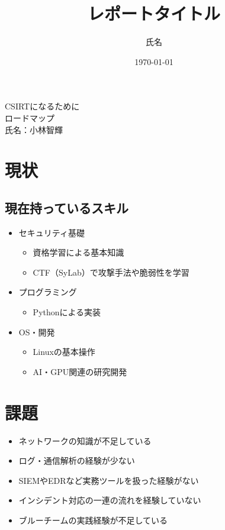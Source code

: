 \documentclass[a4paper,11pt,lualatex,ja=standard]{bxjsarticle}
\newcommand{\cover}[3]{
  \thispagestyle{empty}
  \vspace*{4cm}
  \begin{center}
    {\LARGE #1}\\[2cm]
    {\Large #2}\\[3cm]
    {\large 氏名：#3}\\[1cm]
  \end{center}
  \newpage
}
\begin{document}
\cover{CSIRTになるために}{ロードマップ}{小林智輝}

\title{レポートタイトル}
\author{氏名}
\date{\today}

\section{現状}

\subsection*{現在持っているスキル}

\begin{itemize}
    \item セキュリティ基礎
    \begin{itemize}
        \item 資格学習による基本知識
        \item CTF（SyLab）で攻撃手法や脆弱性を学習
    \end{itemize}

    \item プログラミング
    \begin{itemize}
        \item Pythonによる実装
    \end{itemize}

    \item OS・開発
    \begin{itemize}
        \item Linuxの基本操作
        \item AI・GPU関連の研究開発
    \end{itemize}
\end{itemize}

\section{課題}

\begin{itemize}
    \item ネットワークの知識が不足している
    \item ログ・通信解析の経験が少ない
    \item SIEMやEDRなど実務ツールを扱った経験がない
    \item インシデント対応の一連の流れを経験していない
    \item ブルーチームの実践経験が不足している
\end{itemize}
\end{document}
